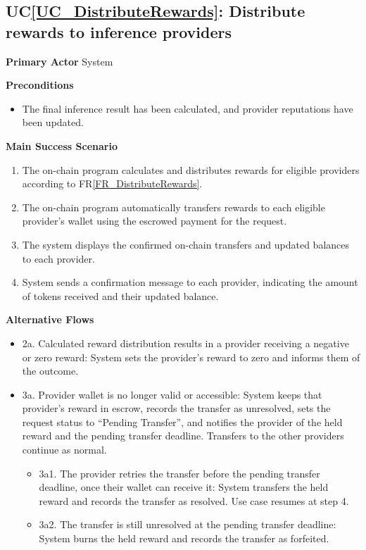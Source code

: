 \documentclass[12pt]{article}
\newcounter{ucnum} %
\newcommand{\ucref}[1]{UC\ref{#1}}
\newcommand{\rref}[1]{FR\ref{#1}}
\begin{document}
 \label{UC_DistributeRewards}
\subsection{\ucref{UC_DistributeRewards}: Distribute rewards to inference providers}

\textbf{Primary Actor}
System

\textbf{Preconditions}
\begin{itemize}
\item The final inference result has been calculated, and provider reputations have been updated.
\end{itemize}

\textbf{Main Success Scenario}
\begin{enumerate}
\item The on-chain program calculates and distributes rewards for eligible
providers according to \rref{FR_DistributeRewards}.
\item The on-chain program automatically transfers rewards to each eligible
provider's wallet using the escrowed payment for the request.
\item The system displays the confirmed on-chain transfers and updated balances
to each provider.
\item System sends a confirmation message to each provider, indicating the amount of tokens received and their updated balance.
\end{enumerate}

\textbf{Alternative Flows}
\begin{itemize}
\item 2a. Calculated reward distribution results in a provider receiving a negative or zero reward: System sets the provider's reward to zero and informs them of the outcome.
\item 3a. Provider wallet is no longer valid or accessible: System keeps that provider's reward in escrow, records the transfer as unresolved, sets the request status to ``Pending Transfer'', and notifies the provider of the held reward and the pending transfer deadline. Transfers to the other providers continue as normal.
  \begin{itemize}
  \item 3a1. The provider retries the transfer before the pending transfer deadline, once their wallet can receive it: System transfers the held reward and records the transfer as resolved. Use case resumes at step 4.
  \item 3a2. The transfer is still unresolved at the pending transfer deadline: System burns the held reward and records the transfer as forfeited.
  \end{itemize}
\end{itemize}
\end{document}

